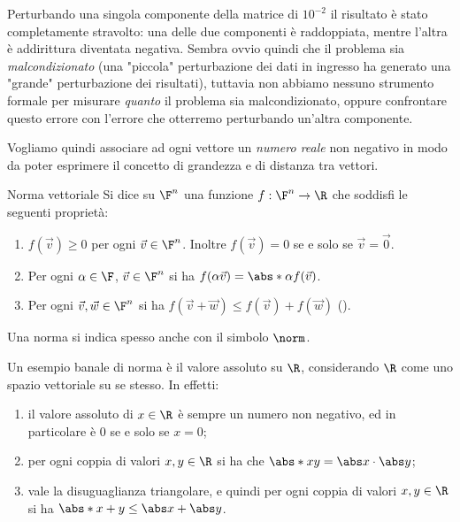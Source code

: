 Perturbando una singola componente della matrice di $10^{-2}$ il risultato è stato completamente stravolto: una delle due componenti è raddoppiata, mentre l'altra è addirittura diventata negativa. 
    Sembra ovvio quindi che il problema sia \emph{malcondizionato} (una "piccola" perturbazione dei dati in ingresso ha generato una "grande" perturbazione dei risultati), tuttavia non abbiamo nessuno strumento formale per misurare \emph{quanto} il problema sia malcondizionato, oppure confrontare questo errore con l'errore che otterremo perturbando un'altra componente.

Vogliamo quindi associare ad ogni vettore un \emph{numero reale} non negativo in modo da poter esprimere il concetto di grandezza e di distanza tra vettori.

\begin{definition}
    {Norma vettoriale}{}
    Si dice  su $\F^n$ una funzione $f : \F^n \to \R$ che soddisfi le seguenti proprietà:
    \begin{enumerate}[(1)]
        \item $f(\vec v) \geq 0$ per ogni $\vec v \in \F^n$. Inoltre $f(\vec v) = 0$ se e solo se $\vec v = \vec 0$.
        \item Per ogni $\alpha \in \F$, $\vec v \in \F^n$ si ha $f(\alpha\vec v) = \abs*{\alpha}f(\vec v)$.
        \item Per ogni $\vec v, \vec w \in \F^n$ si ha $f(\vec v + \vec w) \leq f(\vec v) + f(\vec w)$ ().  
    \end{enumerate} 
    Una norma si indica spesso anche con il simbolo $\norm$. 
\end{definition}

Un esempio banale di norma è il valore assoluto su $\R$, considerando $\R$ come uno spazio vettoriale su se stesso. In effetti:
\begin{enumerate}[(1)]
    \item il valore assoluto di $x \in \R$ è sempre un numero non negativo, ed in particolare è $0$ se e solo se $x = 0$;
    \item per ogni coppia di valori $x, y \in \R$ si ha che $\abs*{xy} = \abs x\cdot\abs y$;
    \item vale la disuguaglianza triangolare, e quindi per ogni coppia di valori $x, y \in \R$ si ha $\abs*{x + y} \leq \abs x + \abs y$. 
\end{enumerate}

